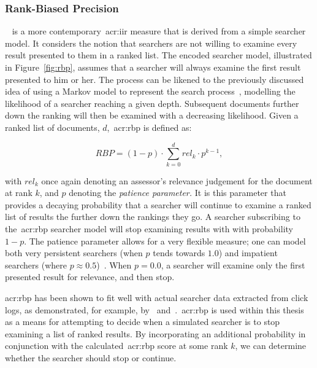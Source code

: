 \subsubsection{Rank-Biased Precision}\label{sec:ir_background:evaluation:system:rbp}
~\citep{moffat2008rbp} is a more contemporary~\gls{acr:iir} measure that is derived from a simple searcher model. It considers the notion that searchers are not willing to examine every result presented to them in a ranked list. The encoded searcher model, illustrated in Figure~\ref{fig:rbp}, assumes that a searcher will always examine the first result presented to him or her. The process can be likened to the previously discussed idea of using a Markov model to represent the search process~\citep{tran2017markov_models}, modelling the likelihood of a searcher reaching a given depth. Subsequent documents further down the ranking will then be examined with a decreasing likelihood. Given a ranked list of documents, $d$,~\gls{acr:rbp} is defined as:

\begin{equation}
RBP = (1 - p) \cdot \sum_{k=0}^{d}rel_k \cdot p^{k-1},
\end{equation}

with $rel_k$ once again denoting an assessor's relevance judgement for the document at rank $k$, and $p$ denoting the \emph{patience parameter.} It is this parameter that provides a decaying probability that a searcher will continue to examine a ranked list of results the further down the rankings they go. A searcher subscribing to the~\gls{acr:rbp} searcher model will stop examining results with with probability $1-p$. The patience parameter allows for a very flexible measure; one can model both very persistent searchers (when $p$ tends towards $1.0$) and impatient searchers (where $p\approx0.5$)~\citep{moffat2008rbp}. When $p=0.0$, a searcher will examine only the first presented result for relevance, and then stop.

\gls{acr:rbp} has been shown to fit well with actual searcher data extracted from click logs, as demonstrated, for example, by~\cite{chapelle2009rbp} and~\cite{zhang2010click_rbp}.~\gls{acr:rbp} is used within this thesis as a means for attempting to decide when a simulated searcher is to stop examining a list of ranked results. By incorporating an additional probability in conjunction with the calculated~\gls{acr:rbp} score at some rank $k$, we can determine whether the searcher should stop or continue.

